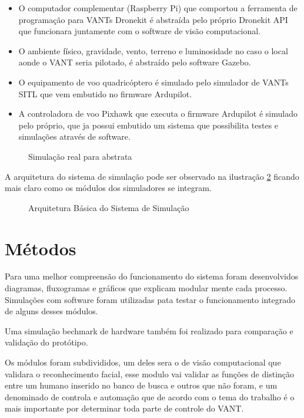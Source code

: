 \begin{itemize}
	\item O computador complementar (Raspberry Pi) que comportou a ferramenta de programação para VANTs Dronekit é abstraída pelo próprio Dronekit API que funcionara juntamente com o software de visão computacional.
	\item O ambiente físico, gravidade, vento, terreno e luminosidade no caso o local aonde o VANT seria pilotado, é abstraído pelo software Gazebo. 
	\item O equipamento de voo quadricóptero é simulado pelo simulador de VANTs SITL que vem embutido no firmware Ardupilot.
	\item A controladora de voo Pixhawk que executa o firmware Ardupilot é simulado pelo próprio, que ja possui embutido um sistema que possibilita testes e simulações através de software.  
\end{itemize} 


\begin{figure}[H]
	\centering
	\caption{Simulação real para abstrata}
	\fontsize{9pt}{12pt}\selectfont
	\def\svgwidth{15cm}
	
	\label{fig:simul}
\end{figure}

A arquitetura do sistema de simulação pode ser observado na ilustração \ref{fig:arc} ficando mais claro como os módulos dos simuladores se integram. 

\begin{figure}[H]
	\centering
	\caption{Arquitetura Básica do Sistema de Simulação}
	\fontsize{9pt}{12pt}\selectfont
	\def\svgwidth{15cm}
	
	\label{fig:arc}
\end{figure}

\section{Métodos}

Para uma melhor compreensão do funcionamento do sistema foram desenvolvidos diagramas, fluxogramas e gráficos que explicam modular mente cada processo. Simulações com software foram utilizadas pata testar o funcionamento integrado de alguns desses módulos. 

Uma simulação bechmark de hardware também foi realizado para comparação e validação do protótipo.

Os módulos foram subdivididos, um deles sera o de visão computacional que validara o reconhecimento facial, esse modulo vai validar as funções de distinção entre um humano inserido no banco de busca e outros que não foram, e um denominado de controla e automação que de acordo com o tema do trabalho é o mais importante por determinar toda parte de controle do VANT.

